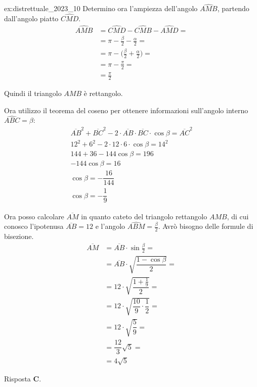 \begin{soluzione}{ex:distrettuale_2023_10}
    Determino ora l'ampiezza dell'angolo $\hat{AMB}$, partendo dall'angolo piatto $\hat{CMD}$.
    \begin{align*}
        \hat{AMB} &= \hat{CMD} - \hat{CMB} - \hat{AMD} = \\
        &= \pi - \frac{\beta}{2} - \frac{\alpha}{2} = \\
        &= \pi - \biggl(\frac{\beta}{2} + \frac{\alpha}{2} \biggr) = \\
        &= \pi - \frac{\pi}{2} = \\
        &= \frac{\pi}{2}
    \end{align*}

    Quindi il triangolo $AMB$ è rettangolo.

    Ora utilizzo il teorema del coseno per ottenere informazioni sull'angolo interno $\hat{ABC} = \beta$:
    \begin{gather*}
        \overline{AB}^2 + \overline{BC}^2 - 2 \cdot \overline{AB} \cdot \overline{BC} \cdot \cos \beta = \overline{AC}^2 \\
        12^2 + 6^2 - 2 \cdot 12 \cdot 6 \cdot \cos \beta = 14^2 \\
        144 + 36 - 144 \cos \beta = 196 \\
        -144 \cos \beta = 16 \\
        \cos \beta = -\dfrac{16}{144} \\
        \cos \beta = -\dfrac{1}{9}
    \end{gather*}

    Ora posso calcolare $\overline{AM}$ in quanto cateto del triangolo rettangolo $AMB$, di cui conosco l'ipotenusa
    $\overline{AB} = 12$ e l'angolo $\hat{ABM} = \frac{\beta}{2}$.
    Avrò bisogno delle formule di bisezione.
    \begin{align*}
        \overline{AM} &= \overline{AB} \cdot \sin \frac{\beta}{2} = \\
        &= \overline{AB} \cdot \sqrt {\dfrac{1 - \cos \beta}{2}} = \\
        &= 12 \cdot \sqrt {\dfrac{1 + \frac{1}{9}}{2}} = \\
        &= 12 \cdot \sqrt {\dfrac{10}{9} \cdot \dfrac{1}{2}} = \\
        &= 12 \cdot \sqrt {\dfrac{5}{9}} = \\
        &= \dfrac{12}{3} \sqrt {5} = \\
        &= 4 \sqrt {5}
    \end{align*}

    Risposta \textbf{C}.
\end{soluzione}